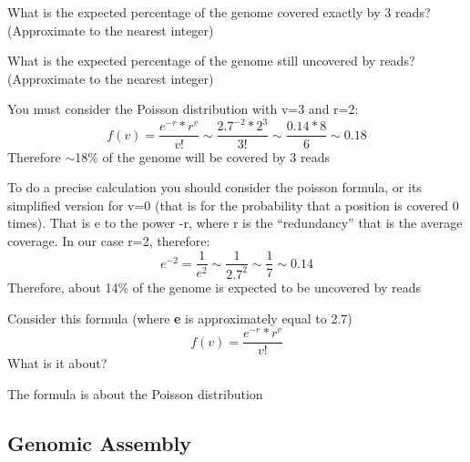\begin{Exercise} [
  label={ex32},
  origin={G. Valle}
 ]

\Question What is the expected percentage of the genome covered exactly by 3
reads? (Approximate to the nearest integer)

\Question What is the expected percentage of the genome still uncovered by
reads? (Approximate to the nearest integer)
\end{Exercise}

\begin{Answer} [
  ref={ex32},
  number={1}
 ]

\Question  You must consider the Poisson distribution with v=3 and r=2:
\begin{equation}
f(v) = \frac{e^{-r}*r^v}{v!} \sim \frac{2.7^{-2}*2^3}{3!} \sim 
\frac{0.14 * 8}{6} \sim 0.18
\end{equation}
Therefore $\sim$18\% of the genome will be covered by 3 reads

\Question To do a precise calculation you should consider the poisson formula,
or its simplified version for v=0 (that is for the probability that a position
is covered 0 times). That is e to the power -r, where r is the ``redundancy''
that is the average coverage. In our case r=2, therefore:
\begin{equation}
e^{-2} = \frac{1}{e^2} \sim \frac{1}{2.7^2} \sim \frac{1}{7} \sim 0.14
\end{equation}
Therefore, about 14\% of the genome is expected to be uncovered by reads
\end{Answer}

\begin{Exercise} [
  label={ex33},
  origin={G. Valle}
 ]

\Question Consider this formula (where \textbf{e} is approximately equal to 2.7)
\begin{equation}
f(v) = \frac{e^{-r}*r^v}{v!}
\end{equation}
What is it about?
\end{Exercise}

\begin{Answer} [
  ref={ex33},
  number={1}
 ]

\Question  The formula is about the Poisson distribution 
\end{Answer}

\subsection{Genomic Assembly}

